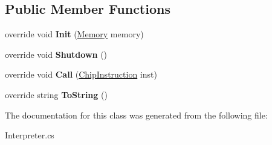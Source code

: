 \subsection*{Public Member Functions}
\begin{DoxyCompactItemize}
\item 
\hypertarget{class_eimu_1_1_core_1_1_systems_1_1_s_chip8_1_1_engines_1_1_interpreter_a6042dea31534cde46ff588153fd8204f}{
override void {\bfseries Init} (\hyperlink{class_eimu_1_1_core_1_1_memory}{Memory} memory)}
\label{class_eimu_1_1_core_1_1_systems_1_1_s_chip8_1_1_engines_1_1_interpreter_a6042dea31534cde46ff588153fd8204f}

\item 
\hypertarget{class_eimu_1_1_core_1_1_systems_1_1_s_chip8_1_1_engines_1_1_interpreter_a60a976f2a4cef24466a54201c2f48b3b}{
override void {\bfseries Shutdown} ()}
\label{class_eimu_1_1_core_1_1_systems_1_1_s_chip8_1_1_engines_1_1_interpreter_a60a976f2a4cef24466a54201c2f48b3b}

\item 
\hypertarget{class_eimu_1_1_core_1_1_systems_1_1_s_chip8_1_1_engines_1_1_interpreter_a13fb1592c190650cf590f81bfcd42091}{
override void {\bfseries Call} (\hyperlink{class_eimu_1_1_core_1_1_systems_1_1_s_chip8_1_1_chip_instruction}{ChipInstruction} inst)}
\label{class_eimu_1_1_core_1_1_systems_1_1_s_chip8_1_1_engines_1_1_interpreter_a13fb1592c190650cf590f81bfcd42091}

\item 
\hypertarget{class_eimu_1_1_core_1_1_systems_1_1_s_chip8_1_1_engines_1_1_interpreter_a431863c5fb5f405f3e2cffa080af5af6}{
override string {\bfseries ToString} ()}
\label{class_eimu_1_1_core_1_1_systems_1_1_s_chip8_1_1_engines_1_1_interpreter_a431863c5fb5f405f3e2cffa080af5af6}

\end{DoxyCompactItemize}


The documentation for this class was generated from the following file:\begin{DoxyCompactItemize}
\item 
Interpreter.cs\end{DoxyCompactItemize}

